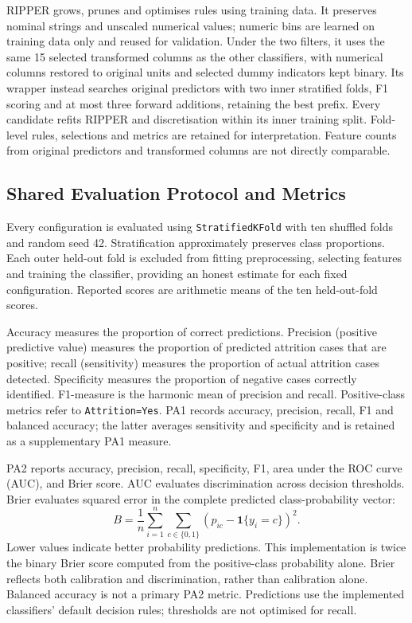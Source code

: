 RIPPER grows, prunes and optimises rules using training data. It preserves nominal
strings and unscaled numerical values; numeric bins are learned on training data
only and reused for validation. Under the two filters, it uses the same 15
selected transformed columns as the other classifiers, with numerical columns
restored to original units and selected dummy indicators kept binary. Its
wrapper instead searches original predictors with two inner stratified folds,
F1 scoring and at most three forward additions, retaining the best prefix.
Every candidate refits RIPPER and discretisation within its inner training
split. Fold-level rules, selections and metrics are retained for interpretation.
Feature counts from original predictors and transformed columns are not directly
comparable.

\subsection{Shared Evaluation Protocol and Metrics}
\label{sec:evaluation}
Every configuration is evaluated using \texttt{StratifiedKFold} with ten shuffled folds and random seed 42. Stratification approximately preserves class proportions. Each outer held-out fold is excluded from fitting preprocessing, selecting features and training the classifier, providing an honest estimate for each fixed configuration. Reported scores are arithmetic means of the ten held-out-fold scores.

Accuracy measures the proportion of correct predictions. Precision (positive predictive value) measures the proportion of predicted attrition cases that are positive; recall (sensitivity) measures the proportion of actual attrition cases detected. Specificity measures the proportion of negative cases correctly identified. F1-measure is the harmonic mean of precision and recall. Positive-class metrics refer to \texttt{Attrition=Yes}. PA1 records accuracy, precision, recall, F1 and balanced accuracy; the latter averages sensitivity and specificity and is retained as a supplementary PA1 measure.

PA2 reports accuracy, precision, recall, specificity, F1, area under the ROC curve (AUC), and Brier score. AUC evaluates discrimination across decision thresholds. Brier evaluates squared error in the complete predicted class-probability vector:
\[
 B=\frac{1}{n}\sum_{i=1}^{n}\sum_{c\in\{0,1\}}
 \left(p_{ic}-\mathbf{1}\{y_i=c\}\right)^2.
\]
Lower values indicate better probability predictions. This implementation is twice the binary Brier score computed from the positive-class probability alone. Brier reflects both calibration and discrimination, rather than calibration alone. Balanced accuracy is not a primary PA2 metric. Predictions use the implemented classifiers' default decision rules; thresholds are not optimised for recall.

